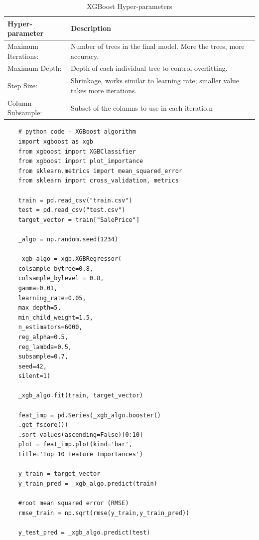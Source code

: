 \documentclass[sigconf]{acmart}
\begin{document}
	\begin{table}[H]
		\center
		\caption{XGBoost Hyper-parameters}
		\label{tab:xgb_param}		
		\begin{tabular}{l p{5cm}}
			\toprule
			Hyper-parameter & Description \\
			\midrule
			Maximum Iterations: & Number of trees in the final model. More the trees, more accuracy. \\
			
			Maximum Depth: & Depth of each individual tree to control overfitting. \\
			
			Step Size: & Shrinkage, works similar to learning rate; smaller value takes more iterations. \\
			
			Column Subsample: & Subset of the columns to use in each iteratio.n \\ 
			\bottomrule
		\end{tabular}
	\end{table}
	
	\begin{verbatim}
	# python code - XGBoost algorithm
	import xgboost as xgb
	from xgboost import XGBClassifier
	from xgboost import plot_importance
	from sklearn.metrics import mean_squared_error
	from sklearn import cross_validation, metrics
	
	train = pd.read_csv("train.csv")
	test = pd.read_csv("test.csv")
	target_vector = train["SalePrice"]
	
	_algo = np.random.seed(1234)
	
	_xgb_algo = xgb.XGBRegressor(
	colsample_bytree=0.8,
	colsample_bylevel = 0.8,
	gamma=0.01,
	learning_rate=0.05,
	max_depth=5,
	min_child_weight=1.5,
	n_estimators=6000,                                                                  
	reg_alpha=0.5,
	reg_lambda=0.5,
	subsample=0.7,
	seed=42,
	silent=1)
	
	_xgb_algo.fit(train, target_vector)   
	
	feat_imp = pd.Series(_xgb_algo.booster()
	.get_fscore())
	.sort_values(ascending=False)[0:10] 
	plot = feat_imp.plot(kind='bar', 
	title='Top 10 Feature Importances')
	
	y_train = target_vector
	y_train_pred = _xgb_algo.predict(train)
	
	#root mean squared error (RMSE)
	rmse_train = np.sqrt(rmse(y_train,y_train_pred))
	
	y_test_pred = _xgb_algo.predict(test)
	
	\end{verbatim}
	
\end{document}
